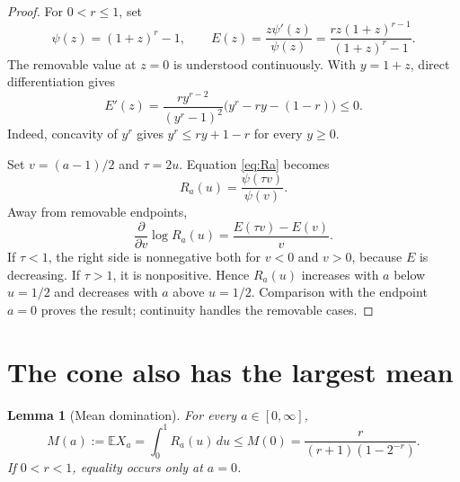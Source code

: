 \documentclass[11pt]{article}
\newtheorem{lemma}[theorem]{Lemma}
\newcommand{\E}{\mathbb E}
\begin{document}
\begin{proof}
For $0<r\le1$, set
\[
 \psi(z)=(1+z)^r-1,\qquad
 E(z)=\frac{z\psi'(z)}{\psi(z)}
 =\frac{rz(1+z)^{r-1}}{(1+z)^r-1}.
\]
The removable value at $z=0$ is understood continuously.  With $y=1+z$,
direct differentiation gives
\begin{equation}\label{eq:Eprime}
 E'(z)=
 \frac{r y^{r-2}}{(y^r-1)^2}
 \bigl(y^r-r y-(1-r)\bigr)\le0.
\end{equation}
Indeed, concavity of $y^r$ gives
$y^r\le r y+1-r$ for every $y\ge0$.

Set $v=(a-1)/2$ and $\tau=2u$.  Equation \eqref{eq:Ra} becomes
\[
 R_a(u)=\frac{\psi(\tau v)}{\psi(v)}.
\]
Away from removable endpoints,
\begin{equation}\label{eq:paramder}
 \frac{\partial}{\partial v}\log R_a(u)
 =\frac{E(\tau v)-E(v)}{v}.
\end{equation}
If $\tau<1$, the right side is nonnegative both for $v<0$ and $v>0$,
because $E$ is decreasing.  If $\tau>1$, it is nonpositive.  Hence
$R_a(u)$ increases with $a$ below $u=1/2$ and decreases with $a$ above
$u=1/2$.  Comparison with the endpoint $a=0$ proves the result; continuity
handles the removable cases.
\end{proof}

\section{The cone also has the largest mean}

\begin{lemma}[Mean domination]\label{lem:mean}
For every $a\in[0,\infty]$,
\begin{equation}\label{eq:meanineq}
 M(a):=\E X_a=\int_0^1R_a(u)\,du
 \le
 M(0)=\frac{r}{(r+1)(1-2^{-r})}.
\end{equation}
If $0<r<1$, equality occurs only at $a=0$.
\end{lemma}
\end{document}
